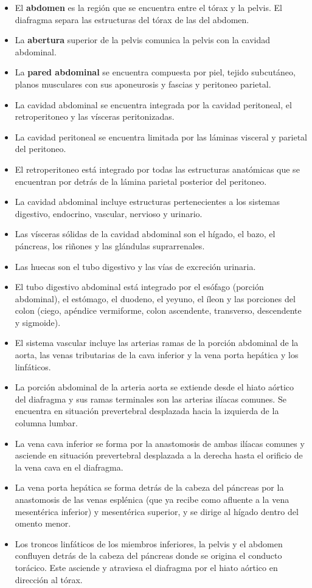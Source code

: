 \begin{itemize}
	\item El \textbf{abdomen} es la región que se encuentra entre el tórax y la pelvis. El diafragma separa las estructuras del tórax de las del abdomen. 
	\item La \textbf{abertura} superior de la pelvis comunica la pelvis con la cavidad abdominal.
	\item La \textbf{pared abdominal} se encuentra compuesta por piel, tejido subcutáneo, planos musculares con sus aponeurosis y fascias y peritoneo parietal.
	\item La cavidad abdominal se encuentra integrada por la cavidad peritoneal, el retroperitoneo y las vísceras peritonizadas.
	\item La cavidad peritoneal se encuentra limitada por las láminas visceral y parietal del peritoneo.
	\item El retroperitoneo está integrado por todas las estructuras anatómicas que se encuentran por detrás de la lámina parietal posterior del peritoneo.
	\item La cavidad abdominal incluye estructuras pertenecientes a los sistemas digestivo, endocrino, vascular, nervioso y urinario.
	\item Las vísceras sólidas de la cavidad abdominal son el hígado, el bazo, el páncreas, los riñones y las glándulas suprarrenales.
	\item Las huecas son el tubo digestivo y las vías de excreción urinaria. 
	\item El tubo digestivo abdominal está integrado por el esófago (porción abdominal), el estómago, el duodeno, el yeyuno, el íleon y las porciones del colon (ciego, apéndice vermiforme, colon ascendente, transverso, descendente y sigmoide).
	\item El sistema vascular incluye las arterias ramas de la porción abdominal de la aorta, las venas tributarias de la cava inferior y la vena porta hepática y los linfáticos.
	\item La porción abdominal de la arteria aorta se extiende desde el hiato aórtico del diafragma y sus ramas terminales son las arterias ilíacas comunes. Se encuentra en situación prevertebral desplazada hacia la izquierda de la columna lumbar. 
	\item La vena cava inferior se forma por la anastomosis de ambas ilíacas comunes y asciende en situación prevertebral desplazada a la derecha hasta el orificio de la vena cava en el diafragma.
	\item La vena porta hepática se forma detrás de la cabeza del páncreas por la anastomosis de las venas esplénica (que ya recibe como afluente a la vena mesentérica inferior) y mesentérica superior, y se dirige al hígado dentro del omento menor.
	\item Los troncos linfáticos de los miembros inferiores, la pelvis y el abdomen confluyen detrás de la cabeza del páncreas donde se origina el conducto torácico. Este asciende y atraviesa el diafragma por el hiato aórtico en dirección al tórax.
\end{itemize}

